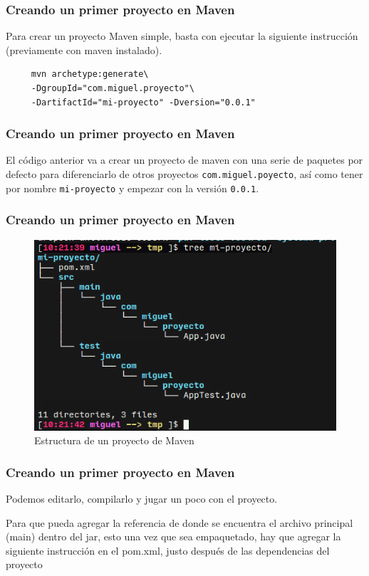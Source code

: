 \documentclass{beamer}
\begin{document}
\begin{frame}[fragile]
   \frametitle{Creando un primer proyecto en Maven}
   Para crear un proyecto Maven simple, basta con ejecutar la
   siguiente instrucción (previamente con maven instalado).

   \begin{verbatim}
     mvn archetype:generate\
     -DgroupId="com.miguel.proyecto"\
     -DartifactId="mi-proyecto" -Dversion="0.0.1"
   \end{verbatim}
\end{frame}

\begin{frame}
  \frametitle{Creando un primer proyecto en Maven}
     El código anterior va a crear un proyecto de maven con una serie de paquetes por
     defecto para diferenciarlo de otros proyectos \texttt{com.miguel.poyecto}, así como tener
     por nombre \texttt{mi-proyecto} y empezar con la versión \texttt{0.0.1}.
\end{frame}

\begin{frame}[fragile]
  \frametitle{Creando un primer proyecto en Maven}

  \begin{figure}[ht]
    \centering
    \includegraphics[scale=0.5]{figures/mvn1.png}
    \caption{\label{fig:maven1} Estructura de un proyecto de Maven}
  \end{figure}

\end{frame}

\begin{frame}
  \frametitle{Creando un primer proyecto en Maven}
  Podemos editarlo, compilarlo y jugar un poco con el proyecto.

  Para que pueda agregar la referencia de donde se encuentra el archivo principal
  (main) dentro del jar, esto una vez que sea empaquetado, hay que agregar la
  siguiente instrucción en el pom.xml, justo después de las dependencias del
  proyecto
\end{frame}
\end{document}
